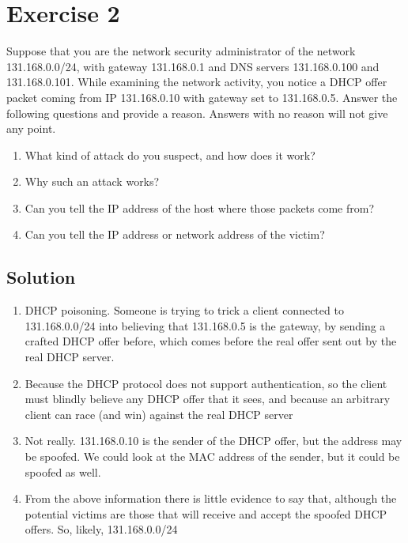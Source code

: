 \section{Exercise 2}

Suppose that you are the network security administrator of the network 131.168.0.0/24, with gateway 131.168.0.1 and DNS servers 131.168.0.100 and 131.168.0.101. 
While examining the network activity, you notice a DHCP offer packet coming from IP 131.168.0.10 with gateway set to 131.168.0.5. 
Answer the following questions and provide a reason. 
Answers with no reason will not give any point.
\begin{enumerate}
    \item What kind of attack do you suspect, and how does it work?
    \item Why such an attack works?
    \item Can you tell the IP address of the host where those packets come from?
    \item Can you tell the IP address or network address of the victim?
\end{enumerate}

\subsection*{Solution}
\begin{enumerate}
    \item DHCP poisoning. Someone is trying to trick a client connected to 131.168.0.0/24 into believing that 131.168.0.5 is the gateway, by sending a crafted DHCP offer before, which comes before the real offer sent out by the real DHCP server.
    \item Because the DHCP protocol does not support authentication, so the client must blindly believe any DHCP offer that it sees, and because an arbitrary client can race (and win) against the real DHCP server
    \item Not really. 131.168.0.10 is the sender of the DHCP offer, but the address may be spoofed.
        We could look at the MAC address of the sender, but it could be spoofed as well.
    \item From the above information there is little evidence to say that, although the potential victims are those that will receive and accept the spoofed DHCP offers. 
        So, likely, 131.168.0.0/24
\end{enumerate}